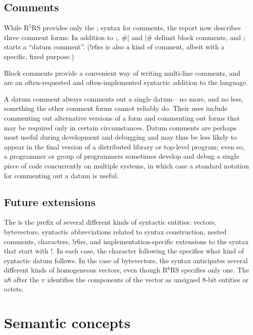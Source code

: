 \documentclass[twoside,twocolumn]{algol60}
\newcommand{\rn}[1]{R$^{#1}$RS}
\begin{document}
 
\section{Comments}

While \rn{5} provides only the {\cf;} syntax for comments, the report
now describes three comment forms: In addition to {\cf;}, {\cf \#|}
and {\cf |\#} delimit block comments, and {\cf\sharpsign;} starts a
``datum comment''.  ({\cf\sharpsign!r6rs} is also a kind of comment,
albeit with a specific, fixed purpose.) 

Block comments provide a convenient way of writing multi-line
comments, and are an often-requested and often-implemented syntactic
addition to the language. 

A datum comment always comments out a single datum---no more, and no less,
something the other comment forms cannot reliably do.
Their uses include commenting out alternative versions of a form and
commenting out forms that may be required only in certain circumstances.
Datum comments are perhaps most useful during development and debugging
and may thus be less likely to appear in the final version of a
distributed library or top-level program; even so, a programmer or group
of programmers sometimes develop and debug a single piece of code
concurrently on multiple systems, in which case a standard notation for
commenting out a datum is useful.

\section{Future extensions}

The {\cf\sharpsign} is the prefix of several different kinds of
syntactic entities: vectors, bytevectors, syntactic abbreviations related
to syntax construction, nested comments, characters,
{\cf\sharpsign!r6rs}, and implementation-specific extensions to the
syntax that start with {\cf\sharpsign!}.  In each case, the character
following the {\cf\sharpsign} specifies what kind of syntactic datum follows.
In the case of bytevectors, the syntax anticipates several different
kinds of homogeneous vectors, even though \rn{6} specifies only
one. The {\cf u8} after the {\cf\sharpsign{}v} identifies the
components of the vector as unsigned 8-bit entities or octets.


\chapter{Semantic concepts}
\end{document}
